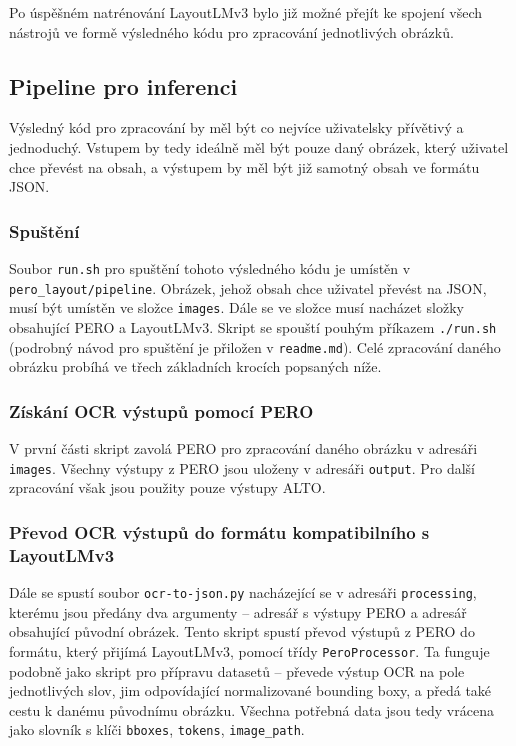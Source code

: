 \documentclass{article}
\begin{document}
Po úspěšném natrénování LayoutLMv3 bylo již možné přejít ke spojení všech nástrojů ve formě výsledného kódu pro zpracování jednotlivých obrázků.


\subsection{Pipeline pro inferenci}
Výsledný kód pro zpracování by měl být co nejvíce uživatelsky přívětivý a jednoduchý. Vstupem by tedy ideálně měl být pouze daný obrázek, který uživatel chce převést na obsah, a výstupem by měl být již samotný obsah ve formátu JSON.

\subsubsection{Spuštění}
Soubor \verb|run.sh| pro spuštění tohoto výsledného kódu je umístěn v \verb|pero_layout/pipeline|. Obrázek, jehož obsah chce uživatel převést na JSON, musí být umístěn ve složce \verb|images|. Dále se ve složce musí nacházet složky obsahující PERO a LayoutLMv3. Skript se spouští pouhým příkazem \verb|./run.sh| (podrobný návod pro spuštění je přiložen v \verb|readme.md|). Celé zpracování daného obrázku probíhá ve třech základních krocích popsaných níže.

\subsubsection{Získání OCR výstupů pomocí PERO}

V první části skript zavolá PERO pro zpracování daného obrázku v adresáři \verb|images|. Všechny výstupy z PERO jsou uloženy v adresáři \verb|output|. Pro další zpracování však jsou použity pouze výstupy ALTO.

\subsubsection{Převod OCR výstupů do formátu kompatibilního s LayoutLMv3}

Dále se spustí soubor \verb|ocr-to-json.py| nacházející se v adresáři \verb|processing|, kterému jsou předány dva argumenty -- adresář s výstupy PERO a adresář obsahující původní obrázek. Tento skript spustí převod výstupů z PERO do formátu, který přijímá LayoutLMv3, pomocí třídy \verb|PeroProcessor|. Ta funguje podobně jako skript pro přípravu datasetů -- převede výstup OCR na pole jednotlivých slov, jim odpovídající normalizované bounding boxy, a předá také cestu k danému původnímu obrázku. Všechna potřebná data jsou tedy vrácena jako slovník s klíči \verb|bboxes|, \verb|tokens|, \verb|image_path|.
\end{document}
